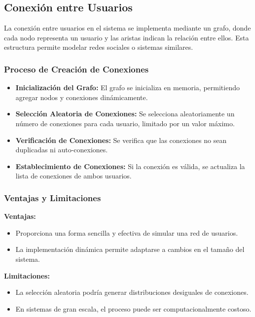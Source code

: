 \documentclass[9pt,letterpaper,onecolumn]{rho-class/rho}
\begin{document}
    \subsection{Conexión entre Usuarios}
    La conexión entre usuarios en el sistema se implementa mediante un grafo, donde cada nodo representa un usuario y las aristas indican la relación entre ellos.
    Esta estructura permite modelar redes sociales o sistemas similares.

    \subsubsection{Proceso de Creación de Conexiones}
    \begin{itemize}
        \item \textbf{Inicialización del Grafo:} El grafo se inicializa en memoria, permitiendo agregar nodos y conexiones dinámicamente.
        \item \textbf{Selección Aleatoria de Conexiones:} Se selecciona aleatoriamente un número de conexiones para cada usuario, limitado por un valor máximo.
        \item \textbf{Verificación de Conexiones:} Se verifica que las conexiones no sean duplicadas ni auto-conexiones.
        \item \textbf{Establecimiento de Conexiones:} Si la conexión es válida, se actualiza la lista de conexiones de ambos usuarios.
    \end{itemize}

    \subsubsection{Ventajas y Limitaciones}
    \textbf{Ventajas:}
    \begin{itemize}
        \item Proporciona una forma sencilla y efectiva de simular una red de usuarios.
        \item La implementación dinámica permite adaptarse a cambios en el tamaño del sistema.
    \end{itemize}
    \textbf{Limitaciones:}
    \begin{itemize}
        \item La selección aleatoria podría generar distribuciones desiguales de conexiones.
        \item En sistemas de gran escala, el proceso puede ser computacionalmente costoso.
    \end{itemize}
\end{document}

